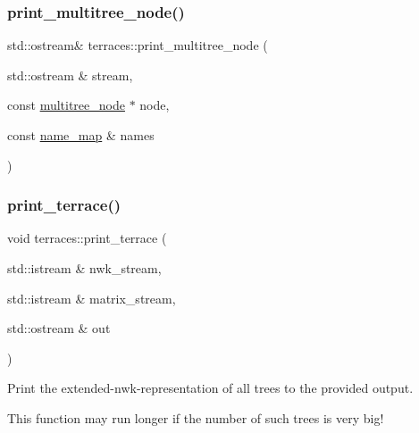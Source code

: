 \mbox{\label{namespaceterraces_ab0b3ce0b155ae5858d90f33dd51bf489}} 
\subsubsection{\texorpdfstring{print\+\_\+multitree\+\_\+node()}{print\_multitree\_node()}}
{\footnotesize\ttfamily std\+::ostream\& terraces\+::print\+\_\+multitree\+\_\+node (\begin{DoxyParamCaption}\item[{std\+::ostream \&}]{stream,  }\item[{const \hyperlink{structterraces_1_1multitree__node}{multitree\+\_\+node} $\ast$}]{node,  }\item[{const \hyperlink{namespaceterraces_a4ef0217fe5aed881737d9bc5a8d45dca}{name\+\_\+map} \&}]{names }\end{DoxyParamCaption})}

\mbox{\label{namespaceterraces_a8945b2604514ca878a2ba568029f1062}} 
\subsubsection{\texorpdfstring{print\+\_\+terrace()}{print\_terrace()}\hspace{0.1cm}{\footnotesize\ttfamily [1/4]}}
{\footnotesize\ttfamily void terraces\+::print\+\_\+terrace (\begin{DoxyParamCaption}\item[{std\+::istream \&}]{nwk\+\_\+stream,  }\item[{std\+::istream \&}]{matrix\+\_\+stream,  }\item[{std\+::ostream \&}]{out }\end{DoxyParamCaption})}

Print the extended-\/nwk-\/representation of all trees to the provided output.

This function may run longer if the number of such trees is very big! \mbox{\label{namespaceterraces_ae35eb2f7d41b44f45b8bb1623f188fe3}} 
